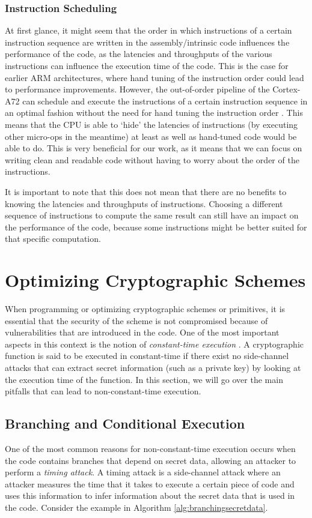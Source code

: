 \documentclass[11pt,a4paper]{report}
\theoremstyle{definition}
\begin{document}
\subsubsection{Instruction Scheduling}
At first glance, it might seem that the order in which instructions of a certain instruction sequence are written in the assembly/intrinsic code influences the performance of the code, as the latencies and throughputs of the various instructions can influence the execution time of the code. This is the case for earlier ARM architectures, where hand tuning of the instruction order could lead to performance improvements. However, the out-of-order pipeline of the Cortex-A72 can schedule and execute the instructions of a certain instruction sequence in an optimal fashion without the need for hand tuning the instruction order \cite{CortexA72OptGuide}. This means that the CPU is able to `hide' the latencies of instructions (by executing other micro-ops in the meantime) at least as well as hand-tuned code would be able to do. This is very beneficial for our work, as it means that we can focus on writing clean and readable code without having to worry about the order of the instructions.

It is important to note that this does not mean that there are no benefits to knowing the latencies and throughputs of instructions. Choosing a different sequence of instructions to compute the same result can still have an impact on the performance of the code, because some instructions might be better suited for that specific computation.

\section{Optimizing Cryptographic Schemes}
\label{sec:optimizingcrypto}
When programming or optimizing cryptographic schemes or primitives, it is essential that the security of the scheme is not compromised because of vulnerabilities that are introduced in the code. One of the most important aspects in this context is the notion of \textit{constant-time execution} \cite{kocher1996timing}. A cryptographic function is said to be executed in constant-time if there exist no side-channel attacks that can extract secret information (such as a private key) by looking at the execution time of the function. In this section, we will go over the main pitfalls that can lead to non-constant-time execution.

\subsection{Branching and Conditional Execution}
\label{sec:branching}
One of the most common reasons for non-constant-time execution occurs when the code contains branches that depend on secret data, allowing an attacker to perform a \textit{timing attack}. A timing attack is a side-channel attack where an attacker measures the time that it takes to execute a certain piece of code and uses this information to infer information about the secret data that is used in the code. Consider the example in Algorithm \ref{alg:branchingsecretdata}.
\end{document}
